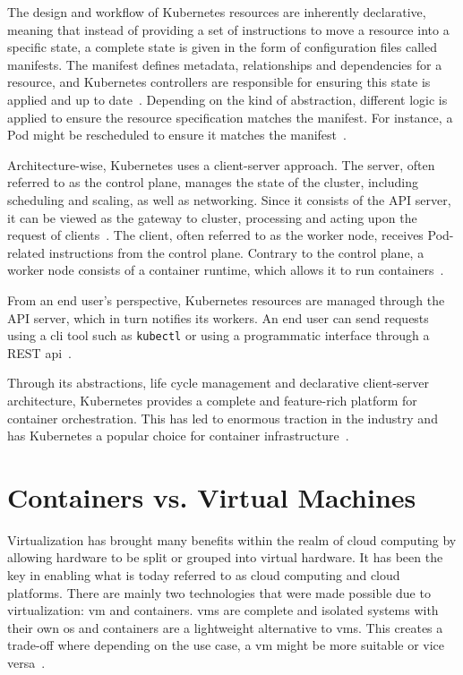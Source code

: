 \documentclass{kththesis}
\begin{document}
The design and workflow of Kubernetes resources are inherently declarative, meaning that instead of providing a set of instructions to move a resource into a specific state, a complete state is given in the form of configuration files called manifests. The manifest defines metadata, relationships and dependencies for a resource, and Kubernetes controllers are responsible for ensuring this state is applied and up to date\ \cite{k8s-docs-controllers}. Depending on the kind of abstraction, different logic is applied to ensure the resource specification matches the manifest. For instance, a Pod might be rescheduled to ensure it matches the manifest\ \cite{container-vm-overview, k8s-overview}. 

Architecture-wise, Kubernetes uses a client-server approach. The server, often referred to as the control plane, manages the state of the cluster, including scheduling and scaling, as well as networking. Since it consists of the API server, it can be viewed as the gateway to cluster, processing and acting upon the request of clients\ \cite{k8s-docs-components}. The client, often referred to as the worker node, receives Pod-related instructions from the control plane. Contrary to the control plane, a worker node consists of a container runtime, which allows it to run containers\ \cite{k8s-overview, k8s-docs-kubeproxy, k8s-docs-kubelet}. 

From an end user's perspective, Kubernetes resources are managed through the API server, which in turn notifies its workers. An end user can send requests using a \Gls{cli} tool such as \texttt{kubectl} or using a programmatic interface through a REST \Gls{api}\ \cite{k8s-overview}. 

Through its abstractions, life cycle management and declarative client-server architecture, Kubernetes provides a complete and feature-rich platform for container orchestration. This has led to enormous traction in the industry and has Kubernetes a popular choice for container infrastructure\ \cite{k8s-it-administration}. 

\section{Containers vs. Virtual Machines}
Virtualization has brought many benefits within the realm of cloud computing by allowing hardware to be split or grouped into virtual hardware. It has been the key in enabling what is today referred to as cloud computing and cloud platforms. There are mainly two technologies that were made possible due to virtualization: \Gls{vm} and containers. \Glspl{vm} are complete and isolated systems with their own \Gls{os} and containers are a lightweight alternative to \Glspl{vm}. This creates a trade-off where depending on the use case, a \Gls{vm} might be more suitable or vice versa\ \cite{container-vm-overview, container-vm-comparison}. 
\end{document}

